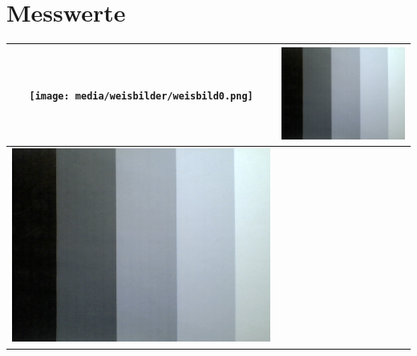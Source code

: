 \section{Messwerte}
\label{chap:VERSUCH_3_MESSWERTE}

\begin{tabular}{|c|c|}
\hline 
\texttt{[image: media/weisbilder/weisbild0.png]}
 & 
\includegraphics[scale=0.25]{media/grauwertkeil.png}
 \\ 
\hline 
\includegraphics[scale=0.25]{media/grauwertkeil.png}
 & 

\end{tabular}
